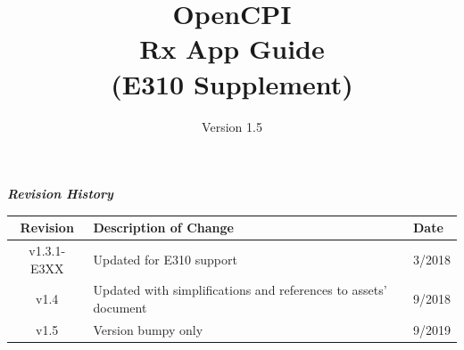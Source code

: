 \def\docTitle{OpenCPI\\ Rx App Guide\\ (E310 Supplement)}
\def\docVersion{1.5}

\date{Version \docVersion} %
\title{\docTitle}
\usepackage{graphicx}
\graphicspath{ {figures/} }
\usepackage{textcomp}


\maketitle
\newpage
	\begin{center}
	\textit{\textbf{Revision History}}
		\begin{table}[H]
		\label{table:revisions} %
			\begin{tabularx}{\textwidth}{|c|X|l|}
			\hline
			\rowcolor{blue}
			\textbf{Revision} & \textbf{Description of Change} & \textbf{Date} \\
			\hline
			v1.3.1-E3XX & Updated for E310 support & 3/2018 \\
			\hline
			v1.4 & Updated with simplifications and references to assets' document & 9/2018 \\
			\hline
			v1.5 & Version bumpy only & 9/2019 \\
			\hline
			\end{tabularx}
		\end{table}
	\end{center}

